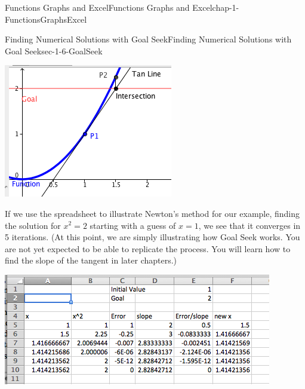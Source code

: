 \documentclass[oneside,10pt,]{book}
\numberwithin{equation}{section}
\begin{document}
\begin{chapterptx}{Functions Graphs and Excel}{}{Functions Graphs and Excel}{}{}{chap-1-FunctionsGraphsExcel}
\begin{sectionptx}{Finding Numerical Solutions with Goal Seek}{}{Finding Numerical Solutions with Goal Seek}{}{}{sec-1-6-GoalSeek}
\begin{sidebyside}{1}{0.1}{0.1}{0}
\begin{sbspanel}{0.8}%
\includegraphics[width=1\linewidth]{images/sec1-6-11.png}
\end{sbspanel}%
\end{sidebyside}%
%
\par
\hypertarget{p-493}{}%
If we use the spreadsheet to illustrate Newton's method for our example, finding the solution for \(x^2 = 2\) starting with a guess of \(x = 1\), we see that it converges in 5 iterations.  (At this point, we are simply illustrating how Goal Seek works.  You are not yet expected to be able to replicate the process.  You will learn how to find the slope of the tangent in later chapters.) \begin{sidebyside}{1}{0.1}{0.1}{0}%
\begin{sbspanel}{0.8}%
\includegraphics[width=1\linewidth]{images/sec1-6-12.png}
\end{sbspanel}%
\end{sidebyside}%
%
\par
\hypertarget{p-494}{}%

\end{sectionptx}
\end{chapterptx}
\end{document}
